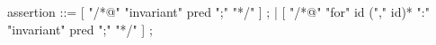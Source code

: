 \begin{syntax}
  assertion ::= [ "/*@" "invariant" pred ";" "*/" ] ;
  | [ { "/*@" "for" id ("," id)* ":" "invariant" pred ";" "*/" } ] ;
\end{syntax}
